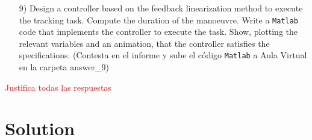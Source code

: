 \documentclass[a4paper]{article}
\begin{document}
\begin{itemize}
\item[9)] Design a controller based on the feedback linearization method to execute the tracking task. Compute the duration of the manoeuvre. Write a \texttt{Matlab} code that implements the controller to execute the task. Show, plotting the relevant variables and an animation, that the controller satisfies the specifications.  (Contesta en el informe y sube el c\'odigo \texttt{Matlab} a Aula Virtual en la carpeta answer\_9)



\end{itemize}

\bigskip

\textcolor{red}{Justifica todas las respuestas}


\newpage

\section*{Solution}
\end{document}
